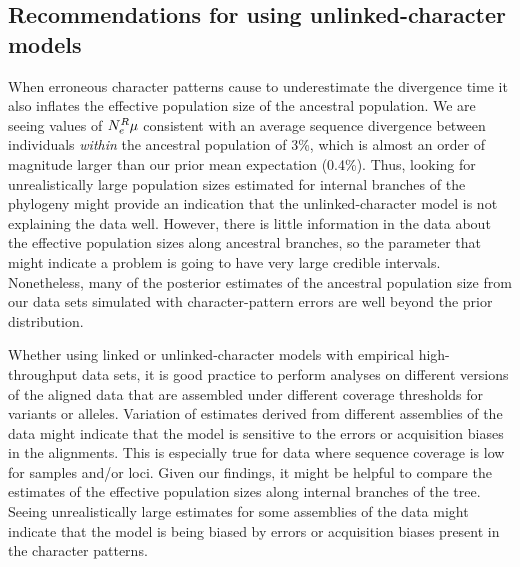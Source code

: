 

\subsection{Recommendations for using unlinked-character models}

When erroneous character patterns cause \ecoevolity to underestimate the
divergence time it also inflates the effective population size of the ancestral
population.
We are seeing values of $N_{e}^{R{}}\mu$ consistent with an average sequence
divergence between individuals \emph{within} the ancestral population of 3\%,
which is almost an order of magnitude larger than our prior mean expectation
(0.4\%).
Thus, looking for unrealistically large population sizes estimated for internal
branches of the phylogeny might provide an indication that the
unlinked-character model is not explaining the data well.
However, there is little information in the data about the effective population
sizes along ancestral branches,
so the parameter that might indicate a problem is going to have very
large credible intervals.
Nonetheless, many of the posterior estimates of the ancestral population size
from our data sets simulated with character-pattern errors are well beyond the
prior distribution.

Whether using linked or unlinked-character models with empirical
high-throughput data sets, it is good practice to perform analyses on
different versions of the aligned data that are assembled under different
coverage thresholds for variants or alleles.
Variation of estimates derived from different assemblies of the data might
indicate that the model is sensitive to the errors or acquisition biases in the
alignments.
This is especially true for data where sequence coverage is low for samples
and/or loci.
Given our findings, it might be helpful to compare the estimates of the
effective population sizes along internal branches of the tree.
Seeing unrealistically large estimates for some assemblies of the
data might indicate that the model is being biased by
errors or acquisition biases present in the character patterns.

